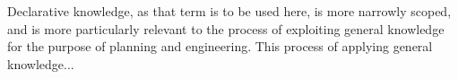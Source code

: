 Declarative knowledge, as that term is to be used here, is more narrowly scoped, and is more particularly relevant to the process of exploiting general knowledge for the purpose of planning and engineering.
This process of applying general knowledge... 

\cite{dretske1981knowledge}




